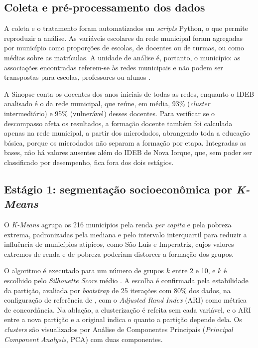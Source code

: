 \subsection{Coleta e pré-processamento dos dados}

A coleta e o tratamento foram automatizados em \textit{scripts} Python, o que permite reproduzir a análise. As variáveis escolares da rede municipal foram agregadas por município como proporções de escolas, de docentes ou de turmas, ou como médias sobre as matrículas. A unidade de análise é, portanto, o município: as associações encontradas referem-se às redes municipais e não podem ser transpostas para escolas, professores ou alunos \parencite{robinson1950}.

A Sinopse conta os docentes dos anos iniciais de todas as redes, enquanto o IDEB analisado é o da rede municipal, que reúne, em média, 93\% (\textit{cluster} intermediário) e 95\% (vulnerável) desses docentes. Para verificar se o descompasso afeta os resultados, a formação docente também foi calculada apenas na rede municipal, a partir dos microdados, abrangendo toda a educação básica, porque os microdados não separam a formação por etapa. Integradas as bases, não há valores ausentes além do IDEB de Nova Iorque, que, sem poder ser classificado por desempenho, fica fora dos dois estágios.

\subsection{Estágio 1: segmentação socioeconômica por \textit{K-Means}}

O \textit{K-Means} \parencite{macqueen1967} agrupa os 216 municípios pela renda \textit{per capita} e pela pobreza extrema, padronizadas pela mediana e pelo intervalo interquartil para reduzir a influência de municípios atípicos, como São Luís e Imperatriz, cujos valores extremos de renda e de pobreza poderiam distorcer a formação dos grupos.

O algoritmo é executado para um número de grupos $k$ entre 2 e 10, e $k$ é escolhido pelo \textit{Silhouette Score} médio \parencite{rousseeuw1987}. A escolha é confirmada pela estabilidade da partição, avaliada por \textit{bootstrap} de 25 iterações com 80\% dos dados, na configuração de referência de \textcite{benhur2002}, com o \textit{Adjusted Rand Index} (ARI) como métrica de concordância. Na ablação, a clusterização é refeita sem cada variável, e o ARI entre a nova partição e a original indica o quanto a partição depende dela. Os \textit{clusters} são visualizados por Análise de Componentes Principais (\textit{Principal Component Analysis}, PCA) com duas componentes.


